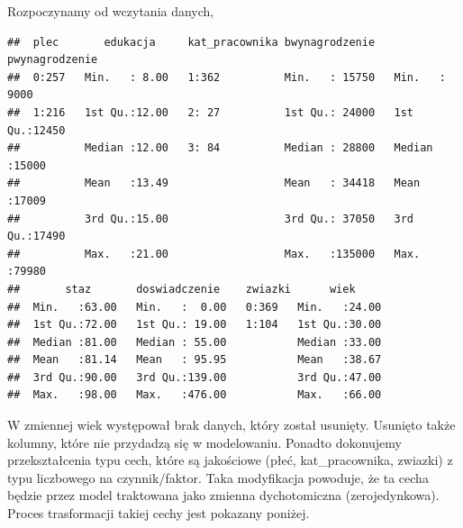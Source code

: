 \documentclass[]{book}
\newenvironment{Shaded}{\begin{snugshade}}{\end{snugshade}}
\newcommand{\DataTypeTok}[1]{\textcolor[rgb]{0.13,0.29,0.53}{#1}}
\newcommand{\KeywordTok}[1]{\textcolor[rgb]{0.13,0.29,0.53}{\textbf{#1}}}
\newcommand{\NormalTok}[1]{#1}
\newcommand{\OperatorTok}[1]{\textcolor[rgb]{0.81,0.36,0.00}{\textbf{#1}}}
\newcommand{\StringTok}[1]{\textcolor[rgb]{0.31,0.60,0.02}{#1}}
\begin{document}
Rozpoczynamy od wczytania danych,

\begin{Shaded}
\end{Shaded}

\begin{verbatim}
##  plec       edukacja     kat_pracownika bwynagrodzenie   pwynagrodzenie 
##  0:257   Min.   : 8.00   1:362          Min.   : 15750   Min.   : 9000  
##  1:216   1st Qu.:12.00   2: 27          1st Qu.: 24000   1st Qu.:12450  
##          Median :12.00   3: 84          Median : 28800   Median :15000  
##          Mean   :13.49                  Mean   : 34418   Mean   :17009  
##          3rd Qu.:15.00                  3rd Qu.: 37050   3rd Qu.:17490  
##          Max.   :21.00                  Max.   :135000   Max.   :79980  
##       staz       doswiadczenie    zwiazki      wiek      
##  Min.   :63.00   Min.   :  0.00   0:369   Min.   :24.00  
##  1st Qu.:72.00   1st Qu.: 19.00   1:104   1st Qu.:30.00  
##  Median :81.00   Median : 55.00           Median :33.00  
##  Mean   :81.14   Mean   : 95.95           Mean   :38.67  
##  3rd Qu.:90.00   3rd Qu.:139.00           3rd Qu.:47.00  
##  Max.   :98.00   Max.   :476.00           Max.   :66.00
\end{verbatim}

W zmiennej wiek występował brak danych, który został usunięty. Usunięto także kolumny, które nie przydadzą się w modelowaniu. Ponadto dokonujemy przekształcenia typu cech, które są jakościowe (płeć, kat\_pracownika, zwiazki) z typu liczbowego na czynnik/faktor. Taka modyfikacja powoduje, że ta cecha będzie przez model traktowana jako zmienna dychotomiczna (zerojedynkowa). Proces trasformacji takiej cechy jest pokazany poniżej.
\end{document}
